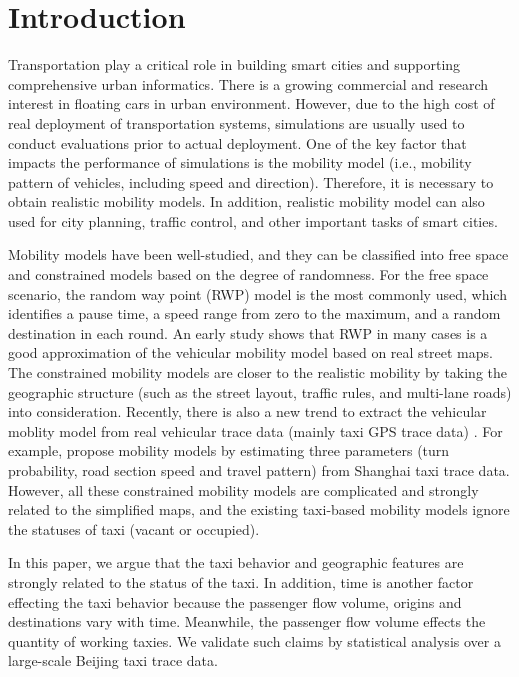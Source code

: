 \section{Introduction}
\label{section_introduction}

Transportation play a critical role in building smart cities and supporting comprehensive urban informatics\cite{trans-1,whq-2012}. There is a growing commercial and research interest in floating cars in urban environment. However, due to the high cost of real deployment of transportation systems, simulations are usually used to conduct evaluations prior to actual deployment. One of the key factor that impacts the performance of simulations is the mobility model (i.e., mobility pattern of vehicles, including speed and direction). Therefore, it is necessary to obtain realistic mobility models. In addition, realistic mobility model can also used for city planning, traffic control, and other important tasks of smart cities.

Mobility models \cite{LuChen-104,AhmedKarmakar-106} have been well-studied, and they can be classified into free space and constrained models based on the degree of randomness.
For the free space scenario, the random way point (RWP) model \cite{broch1998performance} is the most commonly used, which identifies a pause time, a speed range from zero to the maximum, and a random destination in each round. An early study \cite{SahaJohnson-91} shows that RWP in many cases is a good approximation of the vehicular mobility model based on real street maps. The constrained mobility models \cite{SahaJohnson-91,MartinezCano-87,ChoffnesBustamante-93}  are closer to the realistic mobility by taking the geographic structure (such as the street layout, traffic rules, and multi-lane roads) into consideration. Recently, there is also a new trend to extract the vehicular moblity model from real vehicular trace data (mainly taxi GPS trace data) \cite{KimKotz-99,HuangZhu-88}. For example, \cite{HuangZhu-88} propose mobility models by estimating three parameters (turn probability, road section speed and travel pattern) from Shanghai taxi trace data. However, all these constrained mobility models are complicated and strongly related to the simplified maps, and the existing taxi-based mobility models ignore the statuses of taxi (vacant or occupied).

In this paper, we argue that the taxi behavior and geographic features are strongly related to the status of the taxi. In addition, time is another factor effecting the taxi behavior because the passenger flow volume, origins and destinations vary with time. Meanwhile, the passenger flow volume effects the quantity of working taxies. We validate such claims by statistical analysis over a large-scale Beijing taxi trace data. 

